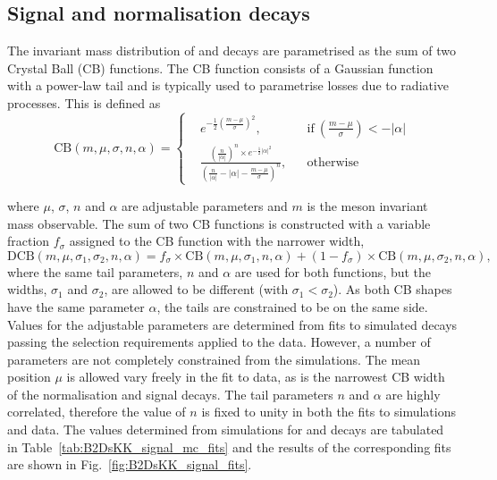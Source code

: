 \subsection{Signal and normalisation decays}
\label{sec:B2DsKK_sigcomps}

The invariant mass distribution of \decay{\Bp}{\Dsp\Dzb} and \decay{\Bp}{\Dsp\Kp\Km} decays are parametrised as the sum of two Crystal Ball (CB) functions.
The CB function consists of a Gaussian function with a power-law tail and is typically used to parametrise losses due to radiative processes.
This is defined as
\begin{equation}
\text{CB}(m,\mu,\sigma,n,\alpha) = \left \{
  \begin{aligned}
    &e^{-\frac{1}{2} \left(\frac{m-\mu}{\sigma}\right)^2}, && \text{if}\ \left(\frac{m-\mu}{\sigma}\right) < -|\alpha|\\
    &\frac{\left(\frac{n}{|\alpha|}\right)^n\times e ^{-\frac{1}{2}|\alpha|^2} }{\left(\frac{n}{|\alpha|}-|\alpha| - \frac{m-\mu}{\sigma}\right)^n}, && \text{otherwise}
  \end{aligned} \right.
\end{equation} 

where $\mu$, $\sigma$, $n$ and $\alpha$ are adjustable parameters and $m$ is the \B meson invariant mass observable.
The sum of two CB functions is constructed with a variable fraction $f_\sigma$ assigned to the CB function with the narrower width,
\begin{equation}
\text{DCB}(m,\mu,\sigma_1,\sigma_2,n,\alpha) = f_\sigma \times \text{CB}(m,\mu,\sigma_1,n,\alpha) + (1-f_\sigma) \times \text{CB}(m,\mu,\sigma_2,n,\alpha),
\label{eq:DoubleBD}
\end{equation}
where the same tail parameters, $n$ and $\alpha$ are used for both functions, but the widths, $\sigma_1$ and $\sigma_2$, are allowed to be different (with $\sigma_1 < \sigma_2$).
As both CB shapes have the same parameter $\alpha$, the tails are constrained to be on the same side.
Values for the adjustable parameters are determined from fits to simulated decays passing the selection requirements applied to the data. 
However, a number of parameters are not completely constrained from the simulations. The mean position $\mu$ is allowed vary freely in the fit to data, as is the narrowest CB width of the normalisation and signal decays. 
The tail parameters $n$ and $\alpha$ are highly correlated, therefore the value of $n$ is fixed to unity in both the fits to simulations and data. The values determined from simulations for \decay{\Bp}{\Dsp\Dzb} and \decay{\Bp}{\Dsp\Kp\Km} decays are tabulated in Table~\ref{tab:B2DsKK_signal_mc_fits} and the results of the corresponding fits are shown in Fig.~\ref{fig:B2DsKK_signal_fits}.


